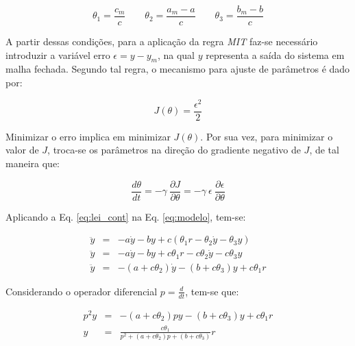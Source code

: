 \begin{equation}
\theta_1 = \frac{c_m}{c}
\qquad
\theta_2 = \frac{a_m - a}{c}
\qquad
\theta_3 = \frac{b_m - b}{c}
\end{equation}

A partir dessas condições, para a aplicação da regra {\it MIT} faz-se necessário
introduzir a variável erro $\epsilon = y - y_m$, na qual $y$ representa a saída
do sistema em malha fechada. Segundo tal regra, o mecanismo para ajuste de
parâmetros é dado por:

\begin{equation}
J(\theta) = \frac{\epsilon^2}{2}
\end{equation}

Minimizar o erro implica em minimizar $J(\theta)$. Por sua vez, para minimizar o
valor de $J$, troca-se os parâmetros na direção do gradiente negativo de $J$, de
tal maneira que:

\begin{equation}\label{eq:J}
\frac{d\theta}{dt} = -\gamma\ \frac{\partial J}{\partial \theta} = 
                     -\gamma\ \epsilon\ \frac{\partial \epsilon}
                                             {\partial \theta}
\end{equation}

Aplicando a Eq. \ref{eq:lei_cont} na Eq. \ref{eq:modelo}, tem-se:

\begin{eqnarray}
\ddot{y} & = & -a\dot{y} - by + c \left( \theta_1r - 
                                         \theta_2\dot{y} - 
                                         \theta_3y\right)\nonumber\\
\ddot{y} & = & -a\dot{y} - by + c\theta_1r - 
                                c\theta_2\dot{y} -
                                c\theta_3y\nonumber\\
\ddot{y} & = & -(a + c\theta_2)\dot{y} - (b + c\theta_3)y + c\theta_1r\nonumber
\end{eqnarray}

Considerando o operador diferencial $p = \frac{d}{dt}$, tem-se que:

\begin{eqnarray}
p^2y & = & - (a + c\theta_2)py - 
             (b + c\theta_3)y + 
             c\theta_1r\nonumber\\
y & = & \frac{c\theta_1}{p^2 + 
                         (a + c\theta_2)p + 
                         (b + c\theta_3)}r\label{eq:y}
\end{eqnarray}

